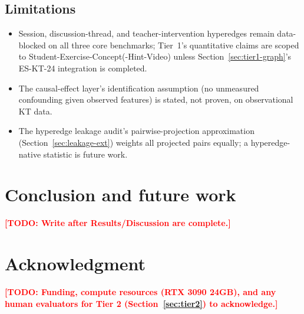 \documentclass[journal]{IEEEtran}
\newcommand{\todo}[1]{\textcolor{red}{\textbf{[TODO: #1]}}}
\begin{document}
\subsection{Limitations}
\label{sec:limitations}
\begin{itemize}
  \item Session, discussion-thread, and teacher-intervention hyperedges
  remain data-blocked on all three core benchmarks; Tier~1's quantitative
  claims are scoped to Student-Exercise-Concept(-Hint-Video) unless
  Section~\ref{sec:tier1-graph}'s ES-KT-24 integration is completed.
  \item The causal-effect layer's identification assumption (no unmeasured
  confounding given observed features) is stated, not proven, on
  observational KT data.
  \item The hyperedge leakage audit's pairwise-projection approximation
  (Section~\ref{sec:leakage-ext}) weights all projected pairs equally; a
  hyperedge-native statistic is future work.
\end{itemize}

\section{Conclusion and future work}
\todo{Write after Results/Discussion are complete.}

\section*{Acknowledgment}
\todo{Funding, compute resources (RTX 3090 24GB), and any human evaluators
for Tier 2 (Section~\ref{sec:tier2}) to acknowledge.}



\end{document}
